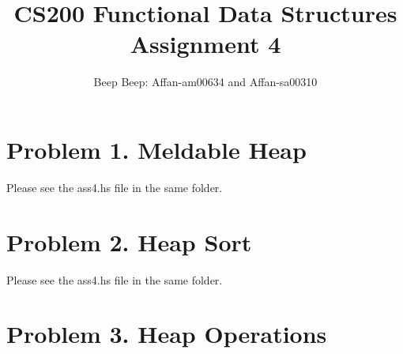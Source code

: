 \documentclass{article}
\title{CS200 Functional Data Structures\\Assignment 4}
\author{Beep Beep: Affan-am00634 and Affan-sa00310}
\begin{document}
\maketitle
\section*{Problem 1. Meldable Heap}
	Please see the ass4.hs file in the same folder.
\section*{Problem 2. Heap Sort}
	Please see the ass4.hs file in the same folder.
\section*{Problem 3. Heap Operations}
	
\end{document}
